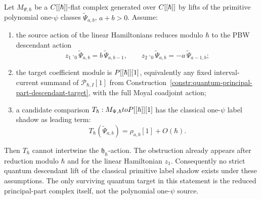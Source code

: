 \begin{thm}
  \label{thm:one-psi-label-hbar-obstruction}
  Let \(M_{\Psi,\hbar}\) be a \(C[[\hbar]]\)-flat complex generated
  over \(C[[\hbar]]\) by lifts of the primitive polynomial
  one-\(\psi\) classes \(\widetilde\Psi_{a,b}\), \(a+b>0\).  Assume:
  \begin{enumerate}
    \item the source action of the linear Hamiltonians reduces modulo
      \(\hbar\) to the PBW descendant action
      \[
        z_1\cdot_0\widetilde\Psi_{a,b}
          =b\,\widetilde\Psi_{a,b-1},\qquad
        z_2\cdot_0\widetilde\Psi_{a,b}
          =-a\,\widetilde\Psi_{a-1,b};
      \]
    \item the target coefficient module is \(P[[\hbar]][1]\),
      equivalently any fixed interval-current summand of
      \(\mathcal P_{\hbar,I}[1]\) from
      Construction~\ref{constr:quantum-principal-part-descendant-target},
      with the full Moyal coadjoint action;
    \item a candidate comparison
	      \(T_\hbar:M_{\Psi,\hbar}toP[[\hbar]][1]\) has the
	      classical one-\(\psi\) label shadow as leading term:
      \[
        T_\hbar(\widetilde\Psi_{a,b})
          =\rho_{a,b}[1]+O(\hbar).
      \]
  \end{enumerate}
  Then \(T_\hbar\) cannot intertwine the
  \(\mathfrak h_\hbar\)-action.  The obstruction already appears after
  reduction modulo \(\hbar\) and for the linear Hamiltonian \(z_1\).
  Consequently no strict quantum descendant lift of the classical
  primitive label shadow exists under these assumptions.  The only
  surviving quantum target in this statement is the reduced
  principal-part complex itself, not the polynomial one-\(\psi\) source.
\end{thm}

